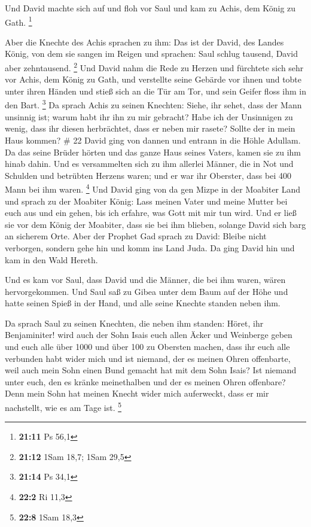  Und David machte sich auf und floh vor Saul und kam zu
Achis, dem König zu Gath. \footnote{\textbf{21:11} Ps 56,1}

 Aber die Knechte des Achis sprachen zu ihm: Das ist der
David, des Landes König, von dem sie sangen im Reigen und sprachen: Saul
schlug tausend, David aber zehntausend. \footnote{\textbf{21:12} 1Sam
  18,7; 1Sam 29,5}  Und David nahm die Rede zu Herzen und
fürchtete sich sehr vor Achis, dem König zu Gath,  und
verstellte seine Gebärde vor ihnen und tobte unter ihren Händen und
stieß sich an die Tür am Tor, und sein Geifer floss ihm in den Bart.
\footnote{\textbf{21:14} Ps 34,1}  Da sprach Achis zu
seinen Knechten: Siehe, ihr sehet, dass der Mann unsinnig ist; warum
habt ihr ihn zu mir gebracht?  Habe ich der Unsinnigen zu
wenig, dass ihr diesen herbrächtet, dass er neben mir rasete? Sollte der
in mein Haus kommen? \# 22  David ging von dannen und
entrann in die Höhle Adullam. Da das seine Brüder hörten und das ganze
Haus seines Vaters, kamen sie zu ihm hinab dahin.  Und es
versammelten sich zu ihm allerlei Männer, die in Not und Schulden und
betrübten Herzens waren; und er war ihr Oberster, dass bei 400 Mann bei
ihm waren. \footnote{\textbf{22:2} Ri 11,3}  Und David ging
von da gen Mizpe in der Moabiter Land und sprach zu der Moabiter König:
Lass meinen Vater und meine Mutter bei euch aus und ein gehen, bis ich
erfahre, was Gott mit mir tun wird.  Und er ließ sie vor dem
König der Moabiter, dass sie bei ihm blieben, solange David sich barg an
sicherem Orte.  Aber der Prophet Gad sprach zu David: Bleibe
nicht verborgen, sondern gehe hin und komm ins Land Juda. Da ging David
hin und kam in den Wald Hereth.

 Und es kam vor Saul, dass David und die Männer, die bei ihm
waren, wären hervorgekommen. Und Saul saß zu Gibea unter dem Baum auf
der Höhe und hatte seinen Spieß in der Hand, und alle seine Knechte
standen neben ihm.

 Da sprach Saul zu seinen Knechten, die neben ihm standen:
Höret, ihr Benjaminiter! wird auch der Sohn Isais euch allen Äcker und
Weinberge geben und euch alle über 1000 und über 100 zu Obersten machen,
 dass ihr euch alle verbunden habt wider mich und ist
niemand, der es meinen Ohren offenbarte, weil auch mein Sohn einen Bund
gemacht hat mit dem Sohn Isais? Ist niemand unter euch, den es kränke
meinethalben und der es meinen Ohren offenbare? Denn mein Sohn hat
meinen Knecht wider mich auferweckt, dass er mir nachstellt, wie es am
Tage ist. \footnote{\textbf{22:8} 1Sam 18,3}

